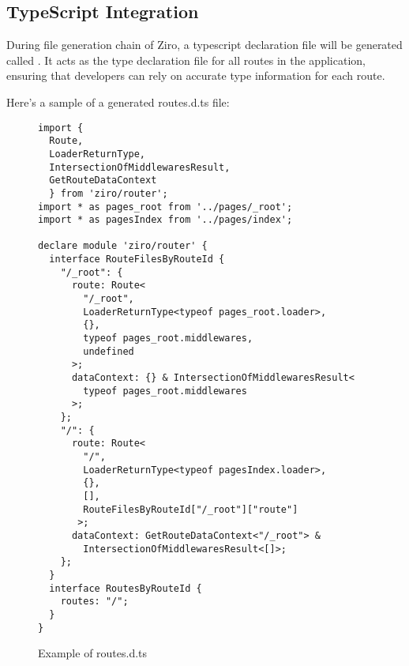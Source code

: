 \subsection{TypeScript Integration}
During file generation chain of Ziro, a typescript declaration file will be generated called . It acts as the type declaration file for all routes in the application, ensuring that developers can rely on accurate type information for each route.

Here’s a sample of a generated routes.d.ts file:

\begin{figure}[H]
\begin{verbatim}
import {
  Route,
  LoaderReturnType,
  IntersectionOfMiddlewaresResult,
  GetRouteDataContext
  } from 'ziro/router';
import * as pages_root from '../pages/_root';
import * as pagesIndex from '../pages/index';

declare module 'ziro/router' {
  interface RouteFilesByRouteId {
    "/_root": {
      route: Route<
        "/_root",
        LoaderReturnType<typeof pages_root.loader>,
        {},
        typeof pages_root.middlewares,
        undefined
      >;
      dataContext: {} & IntersectionOfMiddlewaresResult<
        typeof pages_root.middlewares
      >;
    };
    "/": {
      route: Route<
        "/",
        LoaderReturnType<typeof pagesIndex.loader>,
        {},
        [],
        RouteFilesByRouteId["/_root"]["route"]
       >;
      dataContext: GetRouteDataContext<"/_root"> &
        IntersectionOfMiddlewaresResult<[]>;
    };
  }
  interface RoutesByRouteId {
    routes: "/";
  }
}
\end{verbatim}
\caption{Example of routes.d.ts}
\end{figure}

